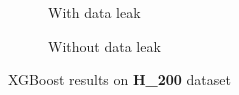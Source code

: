       \begin{figure}[H]
        \centering
        \begin{subfigure}{0.45\textwidth}
          \centering
          \resizebox{\textwidth}{!}{}
          \captionsetup{justification=centering}
          \caption{With data leak}
        \end{subfigure}%
        \hspace{0.05\textwidth}
        \begin{subfigure}{0.45\textwidth}
          \centering
          \resizebox{\textwidth}{!}{}
          \captionsetup{justification=centering}
          \caption{Without data leak}
        \end{subfigure}
        \caption{XGBoost results on \textbf{H\_200} dataset}\label{fig:pseu-st_h200}
      \end{figure}

